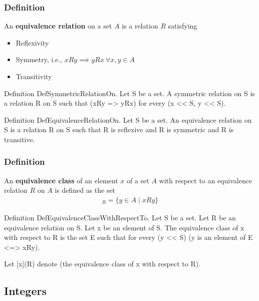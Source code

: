 \subsubsection{Definition}
\begin{true}
An \textbf{equivalence relation} on a set $A$ is a relation $R$ satisfying
\begin{itemize}
    \item Reflexivity
    \item Symmetry, i.e., $xRy \implies yRx \ \forall x,y \in A$
    \item Transitivity
\end{itemize}
\end{true}
\begin{forthel}
Definition DefSymmetricRelationOn. 
    Let S be a set.
    A symmetric relation on S is a relation R on S such that
    (xRy => yRx) for every (x << S, y << S).

Definition DefEquivalenceRelationOn.
    Let S be a set.
    An equivalence relation on S is a relation R on S such that
    R is reflexive and R is symmetric and R is transitive.
\end{forthel}

\subsubsection{Definition}
\begin{true}
An \textbf{equivalence class} of an element $x$ of a set $A$ with respect to an equivalence relation $R$ on $A$ is defined as the set
\begin{align*}
    [x]_R = \{y \in A \mid xRy\}
\end{align*}
\end{true}
\begin{forthel}
Definition DefEquivalenceClassWithRespectTo.
    Let S be a set.
    Let R be an equivalence relation on S.
    Let x be an element of S.
    The equivalence class of x with respect to R is the set E
    such that for every (y << S) (y is an element of E <=> xRy).

Let [x](R) denote (the equivalence class of x with respect to R).
\end{forthel}

\subsection{Integers}

